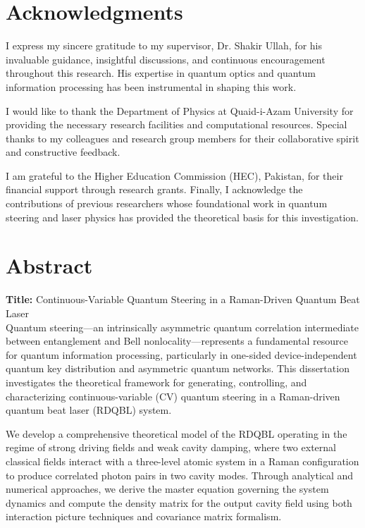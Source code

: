 \documentclass[12pt,a4paper]{report}
\begin{document}
\setcounter{page}{8}
\newpage

\chapter*{Acknowledgments}
I express my sincere gratitude to my supervisor, Dr. Shakir Ullah, for his invaluable guidance, insightful discussions, and continuous encouragement throughout this research. His expertise in quantum optics and quantum information processing has been instrumental in shaping this work.

I would like to thank the Department of Physics at Quaid-i-Azam University for providing the necessary research facilities and computational resources. Special thanks to my colleagues and research group members for their collaborative spirit and constructive feedback.

I am grateful to the Higher Education Commission (HEC), Pakistan, for their financial support through research grants. Finally, I acknowledge the contributions of previous researchers whose foundational work in quantum steering and laser physics has provided the theoretical basis for this investigation.

\newpage

\chapter*{Abstract}

\noindent \textbf{Title:} Continuous-Variable Quantum Steering in a Raman-Driven Quantum Beat Laser\\[0.5cm]

Quantum steering—an intrinsically asymmetric quantum correlation intermediate between entanglement and Bell nonlocality—represents a fundamental resource for quantum information processing, particularly in one-sided device-independent quantum key distribution and asymmetric quantum networks. This dissertation investigates the theoretical framework for generating, controlling, and characterizing continuous-variable (CV) quantum steering in a Raman-driven quantum beat laser (RDQBL) system.

We develop a comprehensive theoretical model of the RDQBL operating in the regime of strong driving fields and weak cavity damping, where two external classical fields interact with a three-level atomic system in a Raman configuration to produce correlated photon pairs in two cavity modes. Through analytical and numerical approaches, we derive the master equation governing the system dynamics and compute the density matrix for the output cavity field using both interaction picture techniques and covariance matrix formalism.
\end{document}
